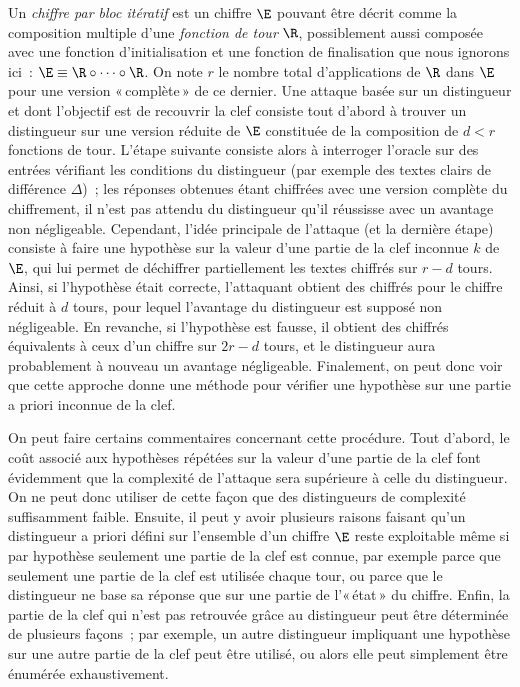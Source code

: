 Un  \emph{chiffre par bloc itératif} est un chiffre $\E$ pouvant être décrit comme la composition multiple
d'une \emph{fonction de tour} $\R$, possiblement aussi composée avec une fonction d'initialisation et une fonction de finalisation
que nous ignorons ici~:
$\E \equiv \R \circ \cdots \circ \R$. On note $r$ le nombre total d'applications de $\R$ dans $\E$ pour une version «\,complète\,» de ce dernier.
Une attaque basée sur un distingueur et dont l'objectif est de recouvrir la clef consiste tout d'abord à trouver un distingueur sur une version
réduite de $\E$ constituée de la composition de $d < r$ fonctions de tour. L'étape suivante consiste alors à interroger l'oracle sur
des entrées vérifiant les conditions du distingueur (par exemple des textes clairs de différence $\Delta$)~; les réponses obtenues étant chiffrées
avec une version complète du chiffrement, il n'est pas attendu du distingueur qu'il réussisse avec un avantage non négligeable.
Cependant, l'idée principale de l'attaque (et la dernière étape) consiste à faire
une hypothèse sur la valeur d'une partie de la clef inconnue $k$ de $\E$,
qui lui permet de déchiffrer partiellement les textes chiffrés sur $r-d$ tours. Ainsi, si l'hypothèse était correcte, l'attaquant obtient des chiffrés pour le
chiffre réduit à $d$ tours, pour lequel l'avantage du distingueur est supposé non négligeable.
En revanche, si l'hypothèse est fausse,
il obtient des chiffrés équivalents à ceux d'un chiffre sur $2r - d$ tours, et le distingueur aura probablement à nouveau un avantage négligeable.
Finalement, on peut donc
voir que cette approche donne une méthode pour vérifier une hypothèse sur une partie a priori inconnue de la clef.

On peut faire certains commentaires concernant cette procédure. Tout d'abord, le coût associé aux hypothèses répétées sur la valeur d'une partie de la clef
font évidemment que la complexité de l'attaque sera supérieure à celle du distingueur. On ne peut donc utiliser de cette façon que
des distingueurs de complexité suffisamment faible.
Ensuite, il peut y avoir plusieurs raisons faisant qu'un distingueur a priori défini sur l'ensemble d'un
chiffre $\E$ reste exploitable même si par hypothèse seulement une partie de la clef est connue, par exemple
parce que seulement une partie de la clef est utilisée chaque tour, ou parce que le distingueur ne base sa réponse que sur une partie de l'«\,état\,» du chiffre.
Enfin, la partie de la clef qui n'est pas retrouvée grâce au distingueur peut être déterminée de plusieurs façons~; par exemple, un autre distingueur
impliquant une hypothèse sur une autre partie de la clef peut être utilisé, ou alors elle peut simplement être énumérée exhaustivement.


